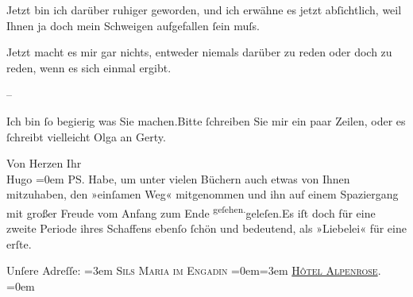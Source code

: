 \pstart
           Jetzt bin ich darüber ruhiger geworden, und ich erwähne es jetzt abſichtlich, weil
               Ihnen ja doch mein Schweigen aufgefallen ſein muſs.\pend
           
\pstart
           Jetzt macht es mir gar nichts, {\pb}entweder niemals darüber zu reden oder doch zu reden, wenn es sich einmal
               ergibt.\pend
           
\pstart
           \numberlinefalse{}–\numberlinetrue{}\pend
           
\pstart
           Ich bin ſo begierig was Sie machen.\hspace*{1.5em}Bitte ſchreiben
               Sie mir ein paar Zeilen, oder es ſchreibt vielleicht Olga an Gerty.\pend
           
\pstart
           Von Herzen Ihr{\\[\baselineskip]}\spacefill\mbox{Hugo}\pend
           \leftskip=0em{}
\pstart
           \noindent{}PS. Habe, um unter vielen Büchern auch etwas von Ihnen mitzuhaben, den »einſamen Weg« mitgenommen und ihn auf einem
                  Spaziergang mit großer Freude vom Anfang zum Ende \substVorne{}\textsuperscript{geſehen.}\substDazwischen{}geleſen.\substHinten{}\hspace*{1.5em}Es iſt doch für eine zweite Periode ihres
                  Schaffens ebenſo ſchön und bedeutend, als {\pb}»Liebelei« für eine erſte.\pend
           
\pstart
           Unſere Adreſſe:\pend
           \leftskip=3em{}
\pstart
           \noindent{}\textsc{Sils Maria im Engadin}\pend
           \leftskip=0em{}\leftskip=3em{}
\pstart
           \textsc{\uline{Hôtel Alpenrose}}.\pend
           \leftskip=0em{}\endnumbering{}  
      
